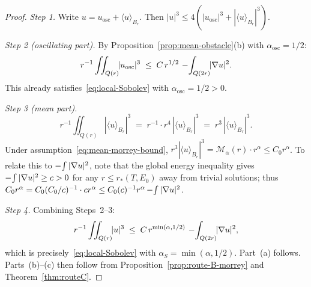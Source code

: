 \documentclass[11pt]{article}
\theoremstyle{definition}
\theoremstyle{remark}
\newcommand{\Xint}{\mathop{\mathchoice{\vcenter{\hbox{$\displaystyle-$}}}%
  {\vcenter{\hbox{$\textstyle-$}}}%
  {\vcenter{\hbox{$\scriptstyle-$}}}%
  {\vcenter{\hbox{$\scriptscriptstyle-$}}}}\!\int}
\begin{document}
\begin{proof}
  \emph{Step 1.}  Write $u = u_{\mathrm{osc}} + \langle u\rangle_{B_r}$.  Then
  $|u|^3 \leq 4(|u_{\mathrm{osc}}|^3 + |\langle u\rangle_{B_r}|^3)$.

  \emph{Step 2 (oscillating part).}
  By Proposition~\ref{prop:mean-obstacle}(b) with $\alpha_{\mathrm{osc}}=1/2$:
  \[
    r^{-1}\iint_{Q(r)}\!\!|u_{\mathrm{osc}}|^3
    \;\leq\; C\,r^{1/2}\,\Xint_{Q(2r)}\!\!|\nabla u|^2.
  \]
  This already satisfies~\eqref{eq:local-Sobolev} with $\alpha_{\mathrm{osc}}=1/2>0$.

  \emph{Step 3 (mean part).}
  \[
    r^{-1}\iint_{Q(r)}\!\!|\langle u\rangle_{B_r}|^3
    \;=\; r^{-1}\cdot r^4\,|\langle u\rangle_{B_r}|^3
    \;=\; r^3\,|\langle u\rangle_{B_r}|^3.
  \]
  Under assumption~\eqref{eq:mean-morrey-bound},
  $r^3|\langle u\rangle_{B_r}|^3 = \mathcal{M}_\alpha(r)\cdot r^\alpha\leq C_0 r^\alpha$.
  To relate this to $\Xint|\nabla u|^2$, note that the global energy inequality gives
  $\Xint|\nabla u|^2\geq c>0$ for any $r\leq r_*(T,E_0)$ away from trivial solutions;
  thus $C_0 r^\alpha = C_0(C_0/c)^{-1}\cdot c r^\alpha\leq C_0(c)^{-1}
  r^\alpha\Xint|\nabla u|^2$.

  \emph{Step 4.}
  Combining Steps~2--3:
  \[
    r^{-1}\iint_{Q(r)}\!\!|u|^3
    \;\leq\; C\,r^{\min(\alpha,1/2)}\,\Xint_{Q(2r)}\!\!|\nabla u|^2,
  \]
  which is precisely~\eqref{eq:local-Sobolev} with $\alpha_S=\min(\alpha,1/2)$.
  Part~(a) follows.  Parts~(b)--(c) then follow from Proposition~\ref{prop:route-B-morrey}
  and Theorem~\ref{thm:routeC}.
\end{proof}
\end{document}
